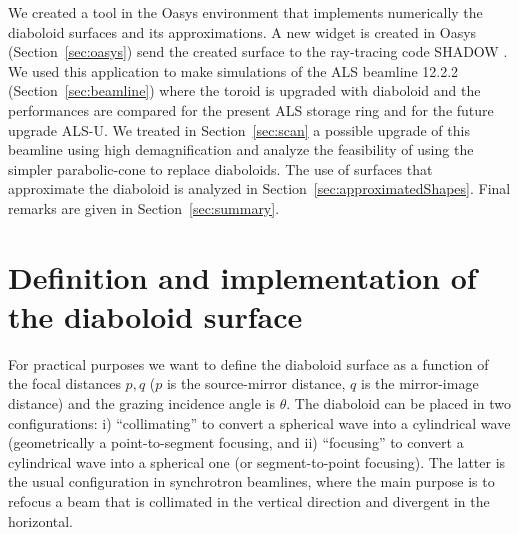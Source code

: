 \documentclass{iucr}              %
\begin{document}
We created a tool in the Oasys environment \cite{codeOASYS} that implements numerically the diaboloid surfaces and its approximations. A new widget is created in Oasys (Section~\ref{sec:oasys}) send the created surface to the ray-tracing code SHADOW \cite{codeSHADOW}. We used this application to make simulations of the ALS beamline 12.2.2 (Section~\ref{sec:beamline}) where the toroid is upgraded with diaboloid and the performances are compared for the present ALS storage ring and for the future upgrade ALS-U. We treated in Section~\ref{sec:scan} a possible upgrade of this beamline using high demagnification and analyze the feasibility of using the simpler parabolic-cone to replace diaboloids. The use of surfaces that approximate the diaboloid is analyzed in Section~\ref{sec:approximatedShapes}. Final remarks are given in Section~\ref{sec:summary}.


\section{Definition and implementation of the diaboloid surface}
\label{sec:DiaboloidEqs}

For practical purposes we want to define the diaboloid surface as a function of the focal distances $p,q$ ($p$ is the source-mirror distance, $q$ is the mirror-image distance) and the grazing incidence angle is $\theta$. The diaboloid can be placed in two configurations: i) ``collimating'' to convert a spherical wave into a cylindrical wave (geometrically a point-to-segment focusing, and ii) ``focusing'' to convert a cylindrical wave into a spherical one (or segment-to-point focusing). The latter is the usual configuration in synchrotron beamlines, where the main purpose is to refocus a beam that is collimated in the vertical direction and divergent in the horizontal. 


\end{document}
